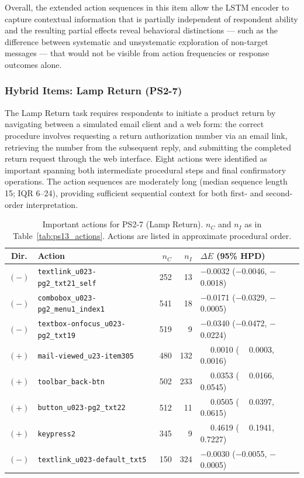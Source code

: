 Overall, the extended action sequences in this item allow the LSTM encoder to capture contextual information that is partially independent of respondent ability and the resulting partial effects reveal behavioral distinctions --- such as the difference between systematic and unsystematic exploration of non-target messages --- that would not be visible from action frequencies or response outcomes alone.

\subsubsection{Hybrid Items: Lamp Return (PS2-7)}

The Lamp Return task requires respondents to initiate a product return by navigating between a simulated email client and a web form: the correct procedure involves requesting a return authorization number via an email link, retrieving the number from the subsequent reply, and submitting the completed return request through the web interface. Eight actions were identified as important spanning both intermediate procedural steps and final confirmatory operations. The action sequences are moderately long (median sequence length 15; IQR 6--24), providing sufficient sequential context for both first- and second-order interpretation.

\begin{table}[htb]
\centering
\small
\begin{tabular}{clrrl}
\toprule
Dir. & Action & $n_C$ & $n_I$ & $\Delta E$ (95\% HPD) \\
\midrule
$(-)$ & \texttt{textlink\_u023-pg2\_txt21\_self}    & 252 &  13 & $-$0.0032 ($-$0.0046, $-$0.0018) \\
$(-)$ & \texttt{combobox\_u023-pg2\_menu1\_index1}  & 541 &  18 & $-$0.0171 ($-$0.0329, $-$0.0005) \\
$(-)$ & \texttt{textbox-onfocus\_u023-pg2\_txt19}  & 519 &   9 & $-$0.0340 ($-$0.0472, $-$0.0224) \\
$(+)$ & \texttt{mail-viewed\_u23-item305}          & 480 & 132 & $\phantom{-}$0.0010 ($\phantom{-}$0.0003, $\phantom{-}$0.0016) \\
$(+)$ & \texttt{toolbar\_back-btn}                & 502 & 233 & $\phantom{-}$0.0353 ($\phantom{-}$0.0166, $\phantom{-}$0.0545) \\
$(+)$ & \texttt{button\_u023-pg2\_txt22}           & 512 &  11 & $\phantom{-}$0.0505 ($\phantom{-}$0.0397, $\phantom{-}$0.0615) \\
$(+)$ & \texttt{keypress2}                        & 345 &   9 & $\phantom{-}$0.4619 ($\phantom{-}$0.1941, $\phantom{-}$0.7227) \\
$(-)$ & \texttt{textlink\_u023-default\_txt5}      & 150 & 324 & $-$0.0030 ($-$0.0055, $-$0.0005) \\
\bottomrule
\end{tabular}
\caption{Important actions for PS2-7 (Lamp Return). $n_C$ and $n_I$ as in Table~\ref{tab:ps13_actions}. Actions are listed in approximate procedural order.}
\label{tab:ps27_actions}
\end{table}

